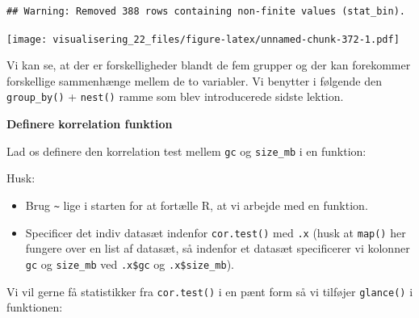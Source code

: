 \documentclass[
]{book}
\newenvironment{Shaded}{\begin{snugshade}}{\end{snugshade}}
\newcommand{\ErrorTok}[1]{\textcolor[rgb]{0.64,0.00,0.00}{\textbf{#1}}}
\newcommand{\FunctionTok}[1]{\textcolor[rgb]{0.00,0.00,0.00}{#1}}
\newcommand{\NormalTok}[1]{#1}
\newcommand{\OtherTok}[1]{\textcolor[rgb]{0.56,0.35,0.01}{#1}}
\newcommand{\SpecialCharTok}[1]{\textcolor[rgb]{0.00,0.00,0.00}{#1}}
\providecommand{\tightlist}{%
  \setlength{\itemsep}{0pt}\setlength{\parskip}{0pt}}
\begin{document}
\begin{verbatim}
## Warning: Removed 388 rows containing non-finite values (stat_bin).
\end{verbatim}

\texttt{[image: visualisering\_22\_files/figure-latex/unnamed-chunk-372-1.pdf]}

Vi kan se, at der er forskelligheder blandt de fem grupper og der kan forekommer forskellige sammenhænge mellem de to variabler. Vi benytter i følgende den \texttt{group\_by()} + \texttt{nest()} ramme som blev introducerede sidste lektion.

\textbf{Definere korrelation funktion}

Lad os definere den korrelation test mellem \texttt{gc} og \texttt{size\_mb} i en funktion:

\begin{Shaded}
\end{Shaded}

Husk:

\begin{itemize}
\tightlist
\item
  Brug \texttt{\textasciitilde{}} lige i starten for at fortælle R, at vi arbejde med en funktion.
\item
  Specificer det indiv datasæt indenfor \texttt{cor.test()} med \texttt{.x} (husk at \texttt{map()} her fungere over en list af datasæt, så indenfor et datasæt specificerer
  vi kolonner \texttt{gc} og \texttt{size\_mb} ved \texttt{.x\$gc} og \texttt{.x\$size\_mb}).
\end{itemize}

Vi vil gerne få statistikker fra \texttt{cor.test()} i en pænt form så vi tilføjer \texttt{glance()} i funktionen:

\begin{Shaded}
\end{Shaded}
\end{document}
